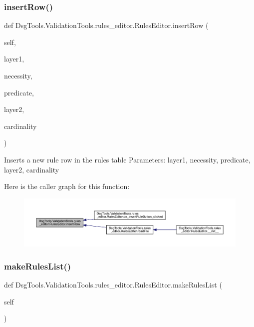 \subsubsection{\texorpdfstring{insert\+Row()}{insertRow()}}
{\footnotesize\ttfamily def Dsg\+Tools.\+Validation\+Tools.\+rules\+\_\+editor.\+Rules\+Editor.\+insert\+Row (\begin{DoxyParamCaption}\item[{}]{self,  }\item[{}]{layer1,  }\item[{}]{necessity,  }\item[{}]{predicate,  }\item[{}]{layer2,  }\item[{}]{cardinality }\end{DoxyParamCaption})}

\begin{DoxyVerb}Inserts a new rule row in the rules table
Parameters: layer1, necessity, predicate, layer2, cardinality
\end{DoxyVerb}
 Here is the caller graph for this function\+:
\nopagebreak
\begin{figure}[H]
\begin{center}
\leavevmode
\includegraphics[width=350pt]{class_dsg_tools_1_1_validation_tools_1_1rules__editor_1_1_rules_editor_aca3554038ae050551f7fffb5cb9bd7fd_icgraph}
\end{center}
\end{figure}
\mbox{\label{class_dsg_tools_1_1_validation_tools_1_1rules__editor_1_1_rules_editor_a8b098bf9c7bfb628789f3bb23f122d9c}} 
\subsubsection{\texorpdfstring{make\+Rules\+List()}{makeRulesList()}}
{\footnotesize\ttfamily def Dsg\+Tools.\+Validation\+Tools.\+rules\+\_\+editor.\+Rules\+Editor.\+make\+Rules\+List (\begin{DoxyParamCaption}\item[{}]{self }\end{DoxyParamCaption})}

